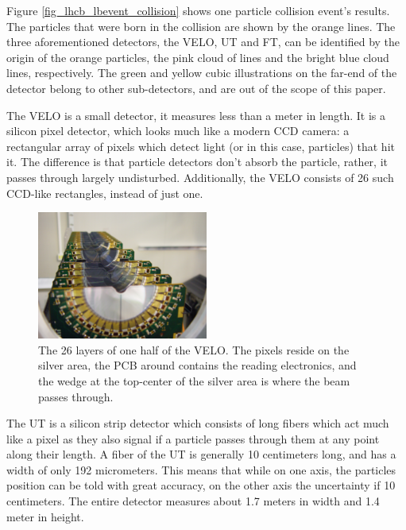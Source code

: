 \documentclass[12pt]{article}
\begin{document}
Figure \ref{fig_lhcb_lbevent_collision} shows one particle collision event's results. The particles that were born in the collision are shown by the orange lines. The three aforementioned detectors, the VELO, UT and FT, can be identified by the origin of the orange particles, the pink cloud of lines and the bright blue cloud lines, respectively. The green and yellow cubic illustrations on the far-end of the detector belong to other sub-detectors, and are out of the scope of this paper.

The VELO is a small detector, it measures less than a meter in length. It is a silicon pixel detector, which looks much like a modern CCD camera: a rectangular array of pixels which detect light (or in this case, particles) that hit it. The difference is that particle detectors don't absorb the particle, rather, it passes through largely undisturbed. Additionally, the VELO consists of 26 such CCD-like rectangles, instead of just one.

\begin{figure}[H]
	\begin{center}
		\includegraphics[width=0.5\textwidth]{detector_velo_real}
	\end{center}
	\caption{The 26 layers of one half of the VELO. The pixels reside on the silver area, the PCB around contains the reading electronics, and the wedge at the top-center of the silver area is where the beam passes through.}
	\label{fig_detector_velo_real}
\end{figure}

The UT is a silicon strip detector which consists of long fibers which act much like a pixel as they also signal if a particle passes through them at any point along their length. A fiber of the UT is generally 10 centimeters long, and has a width of only 192 micrometers. This means that while on one axis, the particles position can be told with great accuracy, on the other axis the uncertainty if 10 centimeters. The entire detector measures about 1.7 meters in width and 1.4 meter in height.
\end{document}
